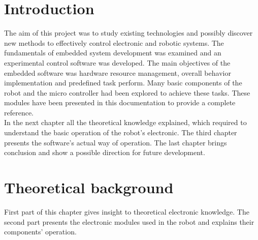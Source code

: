 \documentclass[11pt,a4paper,oneside,article]{memoir}
\begin{document}
\newpage

\pagestyle{plain}

\setcounter{page}{1} %

\chapter{Introduction}
The aim of this project was to study existing technologies and possibly discover new methods to effectively control electronic and robotic systems. The fundamentals of embedded system development was examined and an experimental control software was developed. The main objectives of the embedded software was hardware resource management, overall behavior implementation and predefined task perform. Many basic components of the robot and the micro controller had been explored to achieve these tasks. These modules have been presented in this documentation to provide a complete reference.\\
In the next chapter all the theoretical knowledge explained, which required to understand the basic operation of the robot's electronic. The third chapter presents the software's actual way of operation. The last chapter brings conclusion and show a possible direction for future development.

\chapter{Theoretical background}

First part of this chapter gives insight to theoretical electronic knowledge. The second part presents the electronic modules used in the robot and explains their components' operation.
\end{document}
